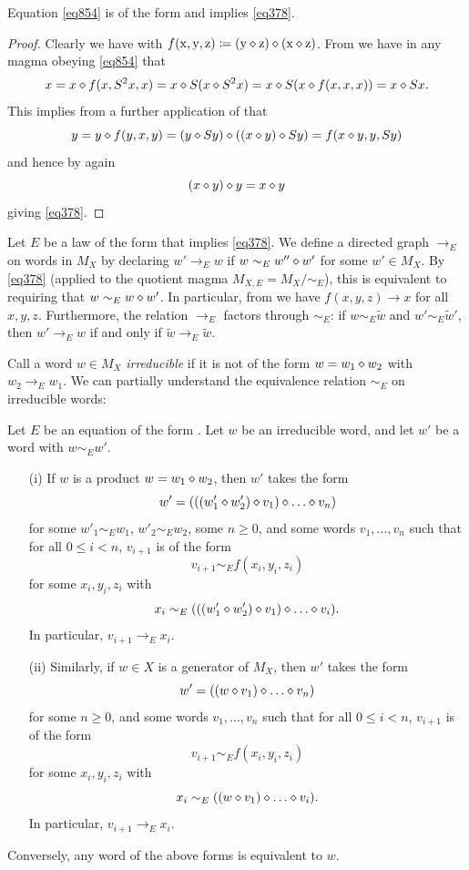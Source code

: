 \begin{lemma}\label{854} Equation \eqref{eq854} is of the form  and implies \eqref{eq378}.
\end{lemma}

\begin{proof}  Clearly we have  with $f(\mathrm{x},\mathrm{y},\mathrm{z}) \coloneqq (\mathrm{y} \diamond \mathrm{z}) \diamond (\mathrm{x} \diamond \mathrm{z})$.  From  we have in any magma obeying \eqref{eq854} that
$$x = x \diamond f(x,S^2 x,x) = x \diamond S(x \diamond S^2 x) = x \diamond S(x \diamond f(x,x,x)) = x \diamond Sx.$$
This implies from a further application of  that
$$ y = y \diamond f(y,x,y) = (y \diamond Sy) \diamond ((x \diamond y) \diamond Sy) = f(x \diamond y, y, Sy)$$
and hence by  again
$$ (x \diamond y) \diamond y = x \diamond y$$
giving \eqref{eq378}.
\end{proof}

Let $E$ be a law of the form  that implies \eqref{eq378}. We define a directed graph $\to_E$ on words in $M_X$ by declaring $w' \to_E w$ if $w \sim_E w'' \diamond w'$ for some $w' \in M_X$.  By \eqref{eq378} (applied to the quotient magma $M_{X,E} = M_X/\sim_E$), this is equivalent to requiring that $w \sim_E w \diamond w'$. In particular, from  we have $f(x,y,z) \to x$ for all $x,y,z$.  Furthermore, the relation $\to_E$ factors through $\sim_E$: if $w \sim_E \tilde w$ and $w' \sim_E \tilde w'$, then $w' \to_E w$ if and only if $\tilde w \to_E \tilde w$.

Call a word $w \in M_X$ \emph{irreducible} if it is not of the form $w = w_1 \diamond w_2$ with $w_2 \to_E w_1$.  We can partially understand the equivalence relation $\sim_E$ on irreducible words:

\begin{theorem}\label{irred-desc}  Let $E$ be an equation of the form .  Let $w$ be an irreducible word, and let $w'$ be a word with $w \sim_E w'$.
  \begin{itemize}
    \item[(i)] If $w$ is a product $w = w_1 \diamond w_2$, then $w'$ takes the form
$$ w' = (((w'_1 \op w'_2) \op v_1) \op \dots \op v_n)$$
for some $w'_1 \sim_E w_1$, $w'_2 \sim_E w_2$, some $n \geq 0$, and some words $v_1, \dots, v_n$ such that for all $0 \leq i < n$, $v_{i+1}$ is of the form
$$ v_{i+1} \sim_E f(x_i,y_i,z_i)$$
for some $x_i, y_i, z_i$ with
$$ x_i \sim_E (((w'_1 \op w'_2) \op v_1) \op \dots \op v_i).$$
In particular, $v_{i+1} \to_E x_i$.
  \item[(ii)] Similarly, if $w \in X$ is a generator of $M_X$, then $w'$ takes the form
$$ w' = ((w \op v_1) \op \dots \op v_n)$$
for some $n \geq 0$, and some words $v_1, \dots, v_n$ such that for all $0 \leq i < n$, $v_{i+1}$ is of the form
$$ v_{i+1} \sim_E f(x_i,y_i,z_i)$$
for some $x_i, y_i, z_i$ with
$$ x_i \sim_E ((w \op v_1) \op \dots \op v_i).$$
In particular, $v_{i+1} \to_E x_i$.
\end{itemize}
Conversely, any word of the above forms is equivalent to $w$.
\end{theorem}


